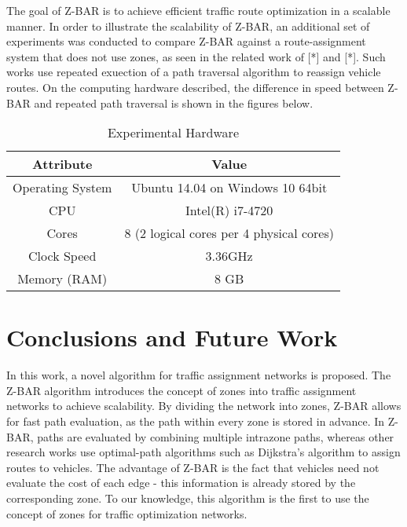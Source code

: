 \documentclass[conference]{IEEEtran}
\begin{document}

The goal of Z-BAR is to achieve efficient traffic route optimization in a scalable manner. In order to illustrate the scalability of Z-BAR, an additional set of experiments was conducted to compare Z-BAR against a route-assignment system that does not use zones, as seen in the related work of  [*] and [*]. Such works use repeated exuection of a path traversal algorithm to reassign vehicle routes. On the computing hardware described, the difference in speed between Z-BAR and repeated path traversal is shown in the figures below.

\begin{table}[H]
\renewcommand{\arraystretch}{1.5}
\caption{Experimental Hardware}
\label{table_example}
\centering

\begin{tabular}{|c|c|}
\hline
Attribute & Value\\
\hline
Operating System & Ubuntu 14.04 on Windows 10 64bit\\
\hline
CPU & Intel(R) i7-4720\\
\hline
Cores & 8 (2 logical cores per 4 physical cores)\\
\hline
Clock Speed & 3.36GHz\\
\hline
Memory (RAM) & 8 GB\\
\hline
\end{tabular}
\end{table}


\section{Conclusions and Future Work} %

In this work, a novel algorithm for traffic assignment networks is proposed. The Z-BAR algorithm introduces the concept of zones into traffic assignment networks to achieve scalability. By dividing the network into zones, Z-BAR allows for fast path evaluation, as the path within every zone is stored in advance. In Z-BAR, paths are evaluated by combining multiple intrazone paths, whereas other research works use optimal-path algorithms such as Dijkstra's algorithm to assign routes to vehicles. The advantage of Z-BAR is the fact that vehicles need not evaluate the cost of each edge - this information is already stored by the corresponding zone. To our knowledge, this algorithm is the first to use the concept of zones for traffic optimization networks. 
\end{document}
